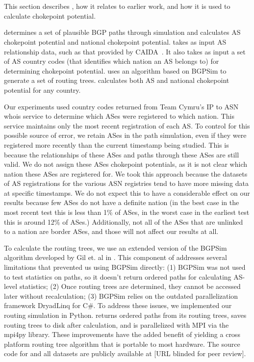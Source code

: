 
\section{\toolname}

This section describes \toolname{}, how it relates to earlier work, and how it is used to calculate chokepoint
potential.

\toolname{} determines a set of plausible BGP paths through simulation and calculates AS
chokepoint potential and national chokepoint potential.  \toolname{} takes as input AS relationship data, such as that provided by
CAIDA~\cite{CAIDA}.  It also takes as input a set of AS
country codes (that identifies which nation an AS belongs to) for
determining chokepoint potential.  \toolname{}
uses an algorithm based on BGPSim \cite{quicksand} to
generate a set of routing trees. \toolname{} 
calculates both AS and national chokepoint potential for any country.

Our experiments used country codes returned from Team Cymru's IP to
ASN whois service \cite{cymru} to determine which ASes were registered
to which nation.  This service maintains only the most recent
registration of each AS.  To control for this possible source of
error, we retain ASes in the path simulation, even if they were
registered more recently than the current timestamp being studied. This is because
the relationships of these ASes and paths through these ASes are still valid.
We do not assign these ASes chokepoint potentials, as it is not clear which nation
these ASes are registered for. We took this approach
because the datasets of AS registrations for the various ASN
registries tend to have more missing data at specific timestamps.
We do not expect this to have a considerable effect on our results
because few ASes do not have a definite nation (in the best case in the most recent
test this is less than 1\% of ASes, in the worst case in the earliest test this is around 12\% of ASes.)
Additionally, not all of the ASes that are unlinked to a nation are border ASes, and those will not
affect our results at all.

\par To calculate the routing trees, we use an extended version of the
BGPSim algorithm developed by Gil et. al in \cite{quicksand}. This
component of \toolname{} addresses several limitations that prevented
us using BGPSim directly: (1) BGPSim was not used to test statistics on paths, so it
doesn't return ordered paths for calculating AS-level statistics; (2)
Once routing trees are determined, they cannot be accessed later
without recalculation; (3) BGPSim relies on the outdated
parallelization framework DryadLinq for C\#. To address these issues,
we implemented our routing simulation in
Python. \toolname{} returns
ordered paths from its routing trees, saves routing trees to disk
after calculation, and is parallelized with MPI via the mpi4py
library. These improvements have the added benefit of yielding a cross
platform routing tree algorithm that is portable to most
hardware. The source code for \toolname{} and all datasets are publicly available at [URL blinded for peer review].


